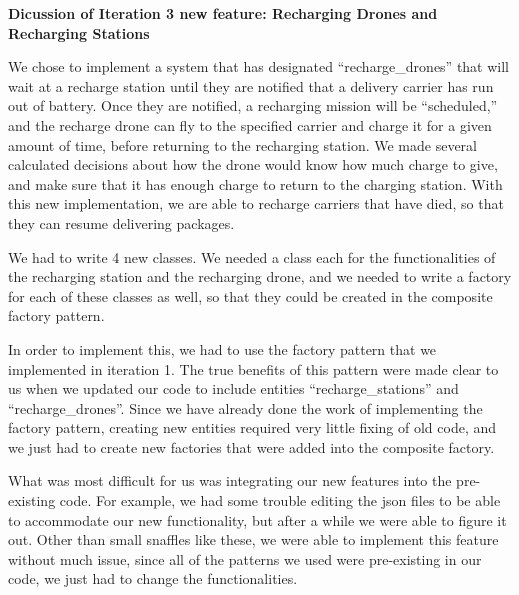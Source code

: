 {\bfseries Dicussion of Iteration 3 new feature\+: Recharging Drones and Recharging Stations}

We chose to implement a system that has designated “recharge\+\_\+drones” that will wait at a recharge station until they are notified that a delivery carrier has run out of battery. Once they are notified, a recharging mission will be “scheduled,” and the recharge drone can fly to the specified carrier and charge it for a given amount of time, before returning to the recharging station. We made several calculated decisions about how the drone would know how much charge to give, and make sure that it has enough charge to return to the charging station. With this new implementation, we are able to recharge carriers that have died, so that they can resume delivering packages.

\begin{center} \end{center} 

\begin{center} \end{center} 

We had to write 4 new classes. We needed a class each for the functionalities of the recharging station and the recharging drone, and we needed to write a factory for each of these classes as well, so that they could be created in the composite factory pattern.

In order to implement this, we had to use the factory pattern that we implemented in iteration 1. The true benefits of this pattern were made clear to us when we updated our code to include entities “recharge\+\_\+stations” and “recharge\+\_\+drones”. Since we have already done the work of implementing the factory pattern, creating new entities required very little fixing of old code, and we just had to create new factories that were added into the composite factory.

What was most difficult for us was integrating our new features into the pre-\/existing code. For example, we had some trouble editing the json files to be able to accommodate our new functionality, but after a while we were able to figure it out. Other than small snaffles like these, we were able to implement this feature without much issue, since all of the patterns we used were pre-\/existing in our code, we just had to change the functionalities.

